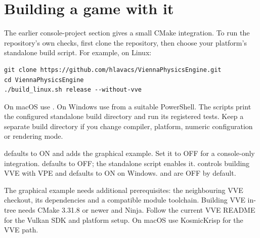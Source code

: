 \documentclass[11pt,a4paper]{article}
\begin{document}
\clearpage\part{Building a game with it}
\label{vpe-core-19}The earlier console-project section gives a small CMake integration. To run the repository's own checks, first clone the repository, then choose your platform's standalone build script. For example, on Linux:\begin{lstlisting}
git clone https://github.com/hlavacs/ViennaPhysicsEngine.git
cd ViennaPhysicsEngine
./build_linux.sh release --without-vve
\end{lstlisting}
On macOS use . On Windows use  from a suitable PowerShell. The scripts print the configured standalone build directory and run its registered tests. Keep a separate build directory if you change compiler, platform, numeric configuration or rendering mode.

 defaults to ON and adds the graphical example. Set it to OFF for a console-only integration.  defaults to OFF; the standalone script enables it.  controls building VVE with VPE and defaults to ON on Windows.  and  are OFF by default.

The graphical example needs additional prerequisites: the neighbouring VVE checkout, its dependencies and a compatible module toolchain. Building VVE in-tree needs CMake 3.31.8 or newer and Ninja. Follow the current VVE README for the Vulkan SDK and platform setup. On macOS use KosmicKrisp for the VVE path.
\end{document}

